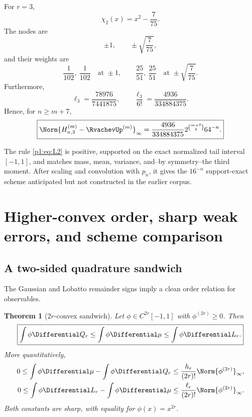 \documentclass[11pt]{article}
\numberwithin{equation}{section}
\newtheorem{theorem}{Theorem}[section]
\theoremstyle{definition}
\theoremstyle{remark}
\begin{document}
\begin{example}
For $r=3$,
\[
 \chi_2(x)=x^2-\frac7{75}.
\]
The nodes are
\begin{equation}
 \pm1,\qquad \pm\sqrt{\frac7{75}},
 \label{p1:eq:L3-nodes}
\end{equation}
and their weights are
\begin{equation}
 \frac1{102},\ \frac1{102}
 \quad\text{at }\pm1,
 \qquad
 \frac{25}{51},\ \frac{25}{51}
 \quad\text{at }\pm\sqrt{\frac7{75}}.
 \label{p1:eq:L3-weights}
\end{equation}
Furthermore,
\[
 \ell_3=\frac{78976}{7441875},
 \qquad
 \frac{\ell_3}{6!}=\frac{4936}{334884375}.
\]
Hence, for $n\ge m+7$,
\begin{equation}
 \boxed{
 \Norm{H_{n,3}^{(m)}-\RvachevUp^{(m)}}_\infty
 =\frac{4936}{334884375}
 2^{\binom{m+7}{2}}64^{-n}.}
 \label{p1:eq:Hn3-error}
\end{equation}
\end{example}

\begin{remark}
The rule \eqref{p1:eq:L2} is positive, supported on the exact normalized tail interval $[-1,1]$, and matches mass, mean, variance, and--by symmetry--the third moment.  After scaling and convolution with $p_n$, it gives the $16^{-n}$ support-exact scheme anticipated but not constructed in the earlier corpus.
\end{remark}

\section{Higher-convex order, sharp weak errors, and scheme comparison}
\label{p1:sec:convex-order}

\subsection{A two-sided quadrature sandwich}

The Gaussian and Lobatto remainder signs imply a clean order relation for observables.

\begin{theorem}[$2r$-convex sandwich]
\label{p1:thm:sandwich}
Let $\phi\in C^{2r}[-1,1]$ with $\phi^{(2r)}\ge0$.  Then
\begin{equation}
 \boxed{
 \int\phi\Differential Q_r
 \le \int\phi\Differential\mu
 \le \int\phi\Differential L_r.}
 \label{p1:eq:sandwich}
\end{equation}
More quantitatively,
\begin{align}
 0\le \int\phi\Differential\mu-\int\phi\Differential Q_r
 &\le \frac{h_r}{(2r)!}\Norm{\phi^{(2r)}}_\infty,
 \label{p1:eq:G-weak-bound}\\
 0\le \int\phi\Differential L_r-\int\phi\Differential\mu
 &\le \frac{\ell_r}{(2r)!}\Norm{\phi^{(2r)}}_\infty.
 \label{p1:eq:L-weak-bound}
\end{align}
Both constants are sharp, with equality for $\phi(x)=x^{2r}$.
\end{theorem}
\end{document}
